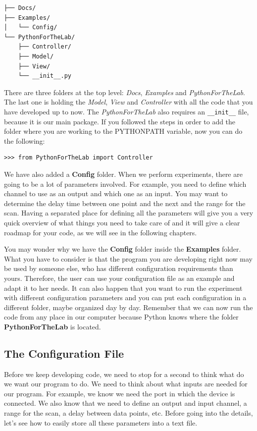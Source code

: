 \begin{verbatim}
├── Docs/
├── Examples/
│   └── Config/
└── PythonForTheLab/
    ├── Controller/
    ├── Model/
    ├── View/
    └── __init__.py
\end{verbatim}

There are three folders at the top level: \emph{Docs}, \emph{Examples} and \emph{PythonForTheLab}. The last one is holding the \emph{Model}, \emph{View} and \emph{Controller} with all the code that you have developed up to now. The \emph{PythonForTheLab} also requires an \texttt{\_\_init\_\_} file, because it is our main package. If you followed the steps in order to add the folder where you are working to the PYTHONPATH variable, now you can do the following:

\begin{verbatim}
>>> from PythonForTheLab import Controller
\end{verbatim}

We have also added a \textbf{Config} folder. When we perform experiments, there are going to be a lot of parameters involved. For example, you need to define which channel to use as an output and which one as an input. You may want to determine the delay time between one point and the next and the range for the scan. Having a separated place for defining all the parameters will give you a very quick overview of what things you need to take care of and it will give a clear roadmap for your code, as we will see in the following chapters. 

You may wonder why we have the \textbf{Config} folder inside the \textbf{Examples} folder. What you have to consider is that the program you are developing right now may be used by someone else, who has different configuration requirements than yours. Therefore, the user can use your configuration file as an example and adapt it to her needs. It can also happen that you want to run the experiment with different configuration parameters and you can put each configuration in a different folder, maybe organized day by day. Remember that we can now run the code from any place in our computer because Python knows where the folder \textbf{PythonForTheLab} is located. 

\subsection{The Configuration File}\label{subsection:configuration-file}
Before we keep developing code, we need to stop for a second to think what do we want our program to do. We need to think about what inputs are needed for our program. For example, we know we need the port in which the device is connected. We also know that we need to define an output and input channel, a range for the scan, a delay between data points, etc. Before going into the details, let's see how to easily store all these parameters into a text file. 

